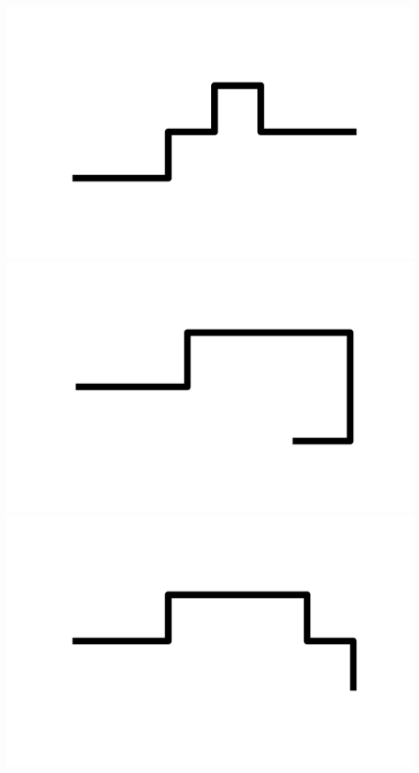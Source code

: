 \documentclass[]{report}
\begin{document}
\includegraphics[scale=.1]{pictures/21/state_cluster_shapes_313.pdf} 
\includegraphics[scale=.1]{pictures/21/state_cluster_shapes_314.pdf} 
\includegraphics[scale=.1]{pictures/21/state_cluster_shapes_315.pdf} 
\end{document}
